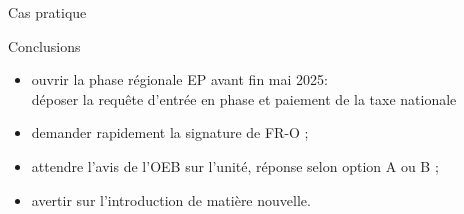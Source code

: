 \begin{frame}{Cas pratique}

\begin{block}{Conclusions}
\begin{itemize}
  \item ouvrir la phase régionale EP avant fin mai 2025:\\
  déposer la requête d’entrée en phase et paiement de la taxe nationale
  \item demander rapidement la signature de FR-O ;
  \item attendre l’avis de l’OEB sur l’unité, réponse selon option A ou B ;
  \item avertir sur l’introduction de matière nouvelle.
\end{itemize}
\end{block}

\end{frame}
